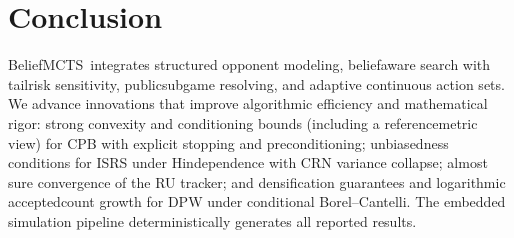 \section{Conclusion}
Belief\textendash MCTS\textendash \sCRF\ integrates structured opponent modeling, belief\textendash aware search with tail\textendash risk sensitivity, public\textendash subgame re\textendash solving, and adaptive continuous action sets. We advance innovations that improve algorithmic efficiency and mathematical rigor: strong convexity and conditioning bounds (including a reference\textendash metric view) for CPB with explicit stopping and preconditioning; unbiasedness conditions for IS\textendash RS under H\textendash independence with CRN variance collapse; almost sure convergence of the RU tracker; and densification guarantees and logarithmic accepted\textendash count growth for DPW under conditional Borel–Cantelli. The embedded simulation pipeline deterministically generates all reported results.

